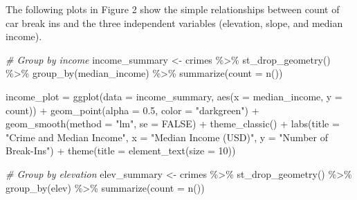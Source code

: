 \documentclass[
]{article}
\newenvironment{Shaded}{\begin{snugshade}}{\end{snugshade}}
\newcommand{\AttributeTok}[1]{\textcolor[rgb]{0.77,0.63,0.00}{#1}}
\newcommand{\CommentTok}[1]{\textcolor[rgb]{0.56,0.35,0.01}{\textit{#1}}}
\newcommand{\ConstantTok}[1]{\textcolor[rgb]{0.00,0.00,0.00}{#1}}
\newcommand{\DecValTok}[1]{\textcolor[rgb]{0.00,0.00,0.81}{#1}}
\newcommand{\FloatTok}[1]{\textcolor[rgb]{0.00,0.00,0.81}{#1}}
\newcommand{\FunctionTok}[1]{\textcolor[rgb]{0.00,0.00,0.00}{#1}}
\newcommand{\NormalTok}[1]{#1}
\newcommand{\OtherTok}[1]{\textcolor[rgb]{0.56,0.35,0.01}{#1}}
\newcommand{\SpecialCharTok}[1]{\textcolor[rgb]{0.00,0.00,0.00}{#1}}
\newcommand{\StringTok}[1]{\textcolor[rgb]{0.31,0.60,0.02}{#1}}
\begin{document}
The following plots in Figure 2 show the simple relationships between
count of car break ins and the three independent variables (elevation,
slope, and median income).

\begin{Shaded}
\begin{Highlighting}[]
\CommentTok{\# Group by income}
\NormalTok{income\_summary }\OtherTok{\textless{}{-}}\NormalTok{ crimes }\SpecialCharTok{\%\textgreater{}\%} 
  \FunctionTok{st\_drop\_geometry}\NormalTok{() }\SpecialCharTok{\%\textgreater{}\%} 
  \FunctionTok{group\_by}\NormalTok{(median\_income) }\SpecialCharTok{\%\textgreater{}\%} 
  \FunctionTok{summarize}\NormalTok{(}\AttributeTok{count =} \FunctionTok{n}\NormalTok{())}

\NormalTok{income\_plot }\OtherTok{=} \FunctionTok{ggplot}\NormalTok{(}\AttributeTok{data =}\NormalTok{ income\_summary, }\FunctionTok{aes}\NormalTok{(}\AttributeTok{x =}\NormalTok{ median\_income, }\AttributeTok{y =}\NormalTok{ count)) }\SpecialCharTok{+}
  \FunctionTok{geom\_point}\NormalTok{(}\AttributeTok{alpha =} \FloatTok{0.5}\NormalTok{, }\AttributeTok{color =} \StringTok{"darkgreen"}\NormalTok{) }\SpecialCharTok{+}
  \FunctionTok{geom\_smooth}\NormalTok{(}\AttributeTok{method =} \StringTok{"lm"}\NormalTok{, }\AttributeTok{se =} \ConstantTok{FALSE}\NormalTok{) }\SpecialCharTok{+}
  \FunctionTok{theme\_classic}\NormalTok{() }\SpecialCharTok{+}
  \FunctionTok{labs}\NormalTok{(}\AttributeTok{title =} \StringTok{"Crime and Median Income"}\NormalTok{,}
       \AttributeTok{x =} \StringTok{"Median Income (USD)"}\NormalTok{,}
       \AttributeTok{y =} \StringTok{"Number of Break{-}Ins"}\NormalTok{) }\SpecialCharTok{+}
  \FunctionTok{theme}\NormalTok{(}\AttributeTok{title =} \FunctionTok{element\_text}\NormalTok{(}\AttributeTok{size =} \DecValTok{10}\NormalTok{))}

\CommentTok{\# Group by elevation}
\NormalTok{elev\_summary }\OtherTok{\textless{}{-}}\NormalTok{ crimes }\SpecialCharTok{\%\textgreater{}\%} 
  \FunctionTok{st\_drop\_geometry}\NormalTok{() }\SpecialCharTok{\%\textgreater{}\%} 
  \FunctionTok{group\_by}\NormalTok{(elev) }\SpecialCharTok{\%\textgreater{}\%} 
  \FunctionTok{summarize}\NormalTok{(}\AttributeTok{count =} \FunctionTok{n}\NormalTok{())}


\end{Highlighting}
\end{Shaded}
\end{document}

